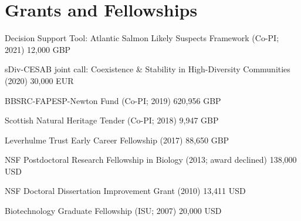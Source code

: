 \documentclass[letterpaper]{article}
\renewenvironment{itemize}{
  \begin{list}{}{
    \setlength{\leftmargin}{1.5em}
  }
}{
  \end{list}
}
\begin{document}
\section*{Grants and Fellowships}
\begin{itemize}
\item Decision Support Tool: Atlantic Salmon Likely Suspects Framework (Co-PI; 2021) \hfill 12,000 GBP
\item sDiv-CESAB joint call: Coexistence \& Stability in High-Diversity Communities (2020) \hfill 30,000 EUR
\item BBSRC-FAPESP-Newton Fund (Co-PI; 2019) \hfill 620,956 GBP
\item Scottish Natural Heritage Tender (Co-PI; 2018) \hfill 9,947 GBP
\item Leverhulme Trust Early Career Fellowship (2017) \hfill 88,650 GBP
\item NSF Postdoctoral Research Fellowship in Biology (2013; award declined) \hfill 138,000 USD
\item NSF Doctoral Dissertation Improvement Grant (2010) \hfill 13,411 USD
\item Biotechnology Graduate Fellowship (ISU; 2007) \hfill 20,000 USD 
\end{itemize}
\end{document}
